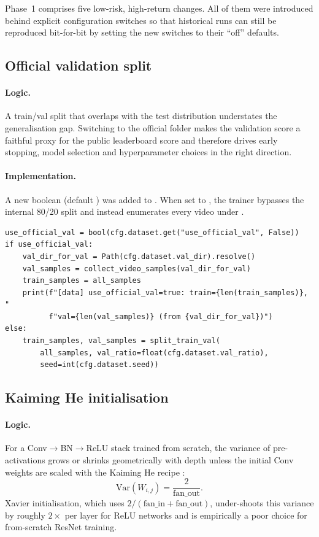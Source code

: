 Phase~1 comprises five low-risk, high-return changes. All of them were
introduced behind explicit configuration switches so that historical runs
can still be reproduced bit-for-bit by setting the new switches to their
``off'' defaults.

\subsection{Official validation split}
\label{sec:phase1:val}

\paragraph{Logic.} A train/val split that overlaps with the test
distribution understates the generalisation gap. Switching to the
official  folder makes the validation score a faithful
proxy for the public leaderboard score and therefore drives early
stopping, model selection and hyperparameter choices in the right
direction.

\paragraph{Implementation.} A new boolean
 (default ) was added to
. When set to , the trainer
bypasses the internal 80/20 split and instead enumerates every video
under .

\begin{lstlisting}[style=py]
use_official_val = bool(cfg.dataset.get("use_official_val", False))
if use_official_val:
    val_dir_for_val = Path(cfg.dataset.val_dir).resolve()
    val_samples = collect_video_samples(val_dir_for_val)
    train_samples = all_samples
    print(f"[data] use_official_val=true: train={len(train_samples)}, "
          f"val={len(val_samples)} (from {val_dir_for_val})")
else:
    train_samples, val_samples = split_train_val(
        all_samples, val_ratio=float(cfg.dataset.val_ratio),
        seed=int(cfg.dataset.seed))
\end{lstlisting}

\subsection{Kaiming He initialisation}
\label{sec:phase1:init}

\paragraph{Logic.} For a Conv$\to$BN$\to$ReLU stack trained from scratch,
the variance of pre-activations grows or shrinks geometrically with depth
unless the initial Conv weights are scaled with the Kaiming He recipe
\cite[Sec.~2.2]{HeICCV2015}:
\[
\mathrm{Var}(W_{i,j}) = \frac{2}{\text{fan\_out}}.
\]
Xavier initialisation, which uses \(2/(\text{fan\_in}+\text{fan\_out})\),
under-shoots this variance by roughly \(2\times\) per layer for ReLU
networks and is empirically a poor choice for from-scratch ResNet
training.

